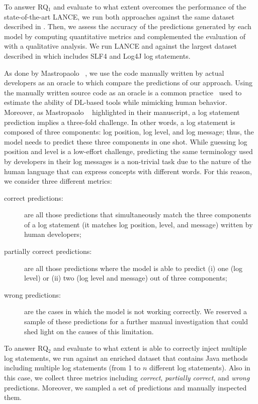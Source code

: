 To answer RQ$_1$ and evaluate to what extent \approach overcomes the performance of the state-of-the-art LANCE, we run both approaches against the same dataset described in . Then, we assess the accuracy of the predictions generated by each model by computing quantitative metrics and complemented the evaluation of \approach with a qualitative analysis. We run LANCE and \approach against the largest dataset described in  which includes SLF4 and Log4J log statements. 

As done by Mastropaolo \etal~\cite{mastropaolo2022using}, we use the code manually written by actual developers as an oracle to which compare the predictions of our approach. Using the manually written source code as an oracle is a common practice~\cite{MASTRO_17_30_40_41} used to estimate the ability of DL-based tools while mimicking human behavior.
Moreover, as Mastropaolo \etal~\cite{mastropaolo2022using} highlighted in their manuscript, a log statement prediction implies a three-fold challenge. In other words, a log statement is composed of three components: log position, log level, and log message; thus, the model needs to predict these three components in one shot. While guessing log position and level is a low-effort challenge, predicting the same terminology used by developers in their log messages is a non-trivial task due to the nature of the human language that can express concepts with different words.
For this reason, we consider three different metrics:
\begin{description}
	\item[correct predictions:] are all those predictions that simultaneously match the three components of a log statement (\ie it matches log position, level, and message) written by human developers;

	\item[partially correct predictions:] are all those predictions where the model is able to predict (i) one (\eg log level) or (ii) two (\eg log level and message) out of three components;

	\item[wrong predictions:] are the cases in which the model is not working correctly. We reserved a sample of these predictions for a further manual investigation that could shed light on the causes of this limitation.
\end{description}

To answer RQ$_2$ and evaluate to what extent \approach is able to correctly inject multiple log statements, we run \approach against an enriched dataset that contains Java methods including multiple log statements (\ie from 1 to $n$ different log statements). Also in this case, we collect three metrics including \emph{correct}, \emph{partially correct}, and \emph{wrong} predictions. Moreover, we sampled a {\color{red}{representative}} set of predictions and manually inspected them.


